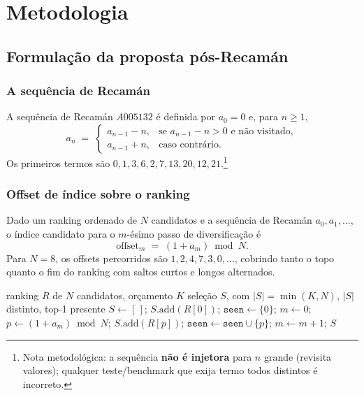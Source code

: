 \section{Metodologia}
\label{sec:metodo}

\subsection{Formulação da proposta pós-Recamán}

\subsubsection{A sequência de Recamán}
\label{sec:recaman-seq}

A sequência de Recamán $A005132$ \citep{Alekseyev2022RecamanCousins} é definida por
$a_0 = 0$ e, para $n\ge 1$,
\[
a_n \;=\; \begin{cases}
a_{n-1} - n, & \text{se } a_{n-1}-n > 0 \text{ e n\~ao visitado},\\
a_{n-1} + n, & \text{caso contr\'ario}.
\end{cases}
\]
Os primeiros termos são $0,1,3,6,2,7,13,20,12,21$.\footnote{Nota metodológica:
a sequência \textbf{não é injetora} para $n$ grande (revisita valores); qualquer
teste/benchmark que exija termo todos distintos é incorreto.}

\subsubsection{Offset de índice sobre o ranking}

Dado um ranking ordenado de $N$ candidatos e a sequência de Recamán
$a_0,a_1,\dots$, o índice candidato para o $m$-ésimo passo de diversificação é
\[
\label{eq:offset}
\mathrm{offset}_m \;=\; (1 + a_m) \bmod N .
\]
Para $N=8$, os offsets percorridos são $1,2,4,7,3,0,\dots$, cobrindo tanto o topo
quanto o fim do ranking com saltos curtos e longos alternados.

\begin{algorithm}[ht]
\caption{Diversificador pós-Recamán (determinístico)}
\label{alg:recaman}
\begin{algorithmic}[1]
\Require ranking $R$ de $N$ candidatos, orçamento $K$
\Ensure seleção $S$, com $|S|=\min(K,N)$, $|S|$ distinto, top-1 presente
\State $S \gets [\,]$; 
\State $S.\mathrm{add}(R[0])$; 
\State $\texttt{seen} \gets \{0\}$; $m \gets 0$;
  \State $p \gets (1 + a_m) \bmod N$;
    \State $S.\mathrm{add}(R[p])$; 
    \State $\texttt{seen} \gets \texttt{seen} \cup \{p\}$;
  \EndIf
  \State $m \gets m+1$;
\EndWhile
\Return $S$
\end{algorithmic}
\end{algorithm}


